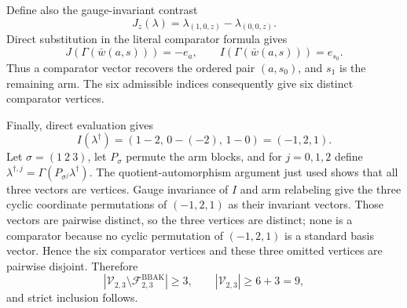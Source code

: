 Define also the gauge-invariant contrast
\[J_z(\lambda)=\lambda_{(1,0,z)}-\lambda_{(0,0,z)}.\]
Direct substitution in the literal comparator formula gives
\[J(\Gamma(\bar w(a,s)))=-e_a,\qquad I(\Gamma(\bar w(a,s)))=e_{s_0}.\]
Thus a comparator vector recovers the ordered pair \((a,s_0)\), and \(s_1\) is the remaining arm. The six admissible indices consequently give six distinct comparator vertices.

Finally, direct evaluation gives
\[I(\lambda^\dagger)=(1-2,\,0-(-2),\,1-0)=(-1,2,1).\]
Let \(\sigma=(1\ 2\ 3)\), let \(P_\sigma\) permute the arm blocks, and for \(j=0,1,2\) define \(\lambda^{\dagger,j}=\Gamma(P_{\sigma^j}\lambda^\dagger)\). The quotient-automorphism argument just used shows that all three vectors are vertices. Gauge invariance of \(I\) and arm relabeling give the three cyclic coordinate permutations of \((-1,2,1)\) as their invariant vectors. Those vectors are pairwise distinct, so the three vertices are distinct; none is a comparator because no cyclic permutation of \((-1,2,1)\) is a standard basis vector. Hence the six comparator vertices and these three omitted vertices are pairwise disjoint. Therefore
\[|\mathcal V_{2,3}\setminus\mathcal F^{\mathrm{BBAK}}_{2,3}|\ge3,\qquad |\mathcal V_{2,3}|\ge6+3=9,\]
and strict inclusion follows.